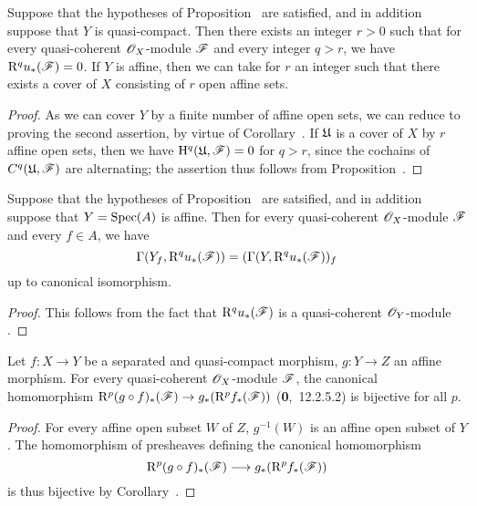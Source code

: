 \begin{cor}[1.4.12]
\label{3.1.4.12}
Suppose that the hypotheses of Proposition~ are satisfied, and in addition suppose that $Y$ is quasi-compact.
Then there exists an integer $r>0$ such that for every quasi-coherent $\mathscr{O}_X$-module $\mathscr{F}$ and every integer $q>r$, we have $\mathrm{R}^q u_*(\mathscr{F})=0$.
If $Y$ is affine, then we can take for $r$ an integer such that there exists a cover of $X$ consisting of $r$ open affine sets.
\end{cor}

\begin{proof}
\label{proof-3.1.4.12}
As we can cover $Y$ by a finite number of affine open sets, we can reduce to proving the second assertion, by virtue of Corollary~.
If $\mathfrak{U}$ is a cover of $X$ by $r$ affine open sets, then we have $\mathrm{H}^q(\mathfrak{U},\mathscr{F})=0$ for $q>r$, since the cochains of $C^q(\mathfrak{U},\mathscr{F})$ are alternating; the assertion thus follows from Proposition~.
\end{proof}

\begin{cor}[1.4.13]
\label{3.1.4.13}
Suppose that the hypotheses of Proposition~ are satsified, and in addition suppose that $Y={\mathop{\mathrm{Spec}}\nolimits}(A)$ is affine.
Then for every quasi-coherent $\mathscr{O}_X$-module $\mathscr{F}$ and every $f\in A$, we have
\[
  \Gamma(Y_f,\mathrm{R}^q u_*(\mathscr{F}))=(\Gamma(Y,\mathrm{R}^q u_*(\mathscr{F}))_f
\]
up to canonical isomorphism.
\end{cor}

\begin{proof}
\label{proof-3.1.4.13}
This follows from the fact that $\mathrm{R}^q u_*(\mathscr{F})$ is a quasi-coherent $\mathscr{O}_Y$-module .
\end{proof}

\begin{prop}[1.4.14]
\label{3.1.4.14}
Let $f:X\to Y$ be a separated and quasi-compact morphism, $g:Y\to Z$ an affine morphism.
For every quasi-coherent $\mathscr{O}_X$-module $\mathscr{F}$, the canonical homomorphism $\RR^p(g\circ f)_*(\sh{F})\to g_*(\RR^p f_*(\sh{F}))$ (\textbf{0},~12.2.5.2) is bijective for all $p$.
\end{prop}

\begin{proof}
\label{proof-3.1.4.14}
For every affine open subset $W$ of $Z$, $g^{-1}(W)$ is an affine open subset of $Y$.
The homomorphism of presheaves defining the canonical homomorphism
\[
  \RR^p(g\circ f)_*(\sh{F})\to g_*(\RR^p f_*(\sh{F}))
\]
 is thus bijective by Corollary~.
\end{proof}

